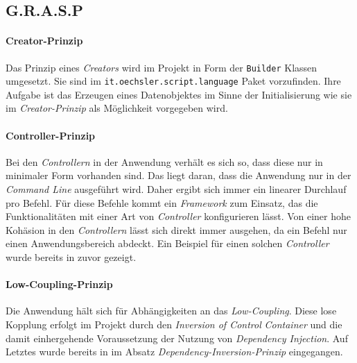 \bgroup

    \label{lst:apply_command}
\egroup

\subsection{G.R.A.S.P}
\label{subsec:grasp}

\paragraph{Creator-Prinzip}

Das Prinzip eines \emph{Creators} wird im Projekt in Form der \texttt{Builder} Klassen umgesetzt.
Sie sind im \texttt{it.oechsler.script.language} Paket vorzufinden.
Ihre Aufgabe ist das Erzeugen eines Datenobjektes im Sinne der Initialisierung wie sie im \emph{Creator-Prinzip} als Möglichkeit vorgegeben wird.

\paragraph{Controller-Prinzip}

Bei den \emph{Controllern} in der Anwendung verhält es sich so, dass diese nur in minimaler Form vorhanden sind.
Das liegt daran, dass die Anwendung nur in der \emph{Command Line} ausgeführt wird.
Daher ergibt sich immer ein linearer Durchlauf pro Befehl.
Für diese Befehle kommt ein \emph{Framework} zum Einsatz, das die Funktionalitäten mit einer Art von \emph{Controller} konfigurieren lässt.
Von einer hohe Kohäsion in den \emph{Controllern} lässt sich direkt immer ausgehen, da ein Befehl nur einen Anwendungsbereich abdeckt.
Ein Beispiel für einen solchen \emph{Controller} wurde bereits in  zuvor gezeigt.

\paragraph{Low-Coupling-Prinzip}

Die Anwendung hält sich für Abhängigkeiten an das \emph{Low-Coupling}.
Diese lose Kopplung erfolgt im Projekt durch den \emph{Inversion of Control} \emph{Container} und die damit einhergehende Voraussetzung der Nutzung von \emph{Dependency Injection}.
Auf Letztes wurde bereits in  im Absatz \emph{Dependency-Inversion-Prinzip} eingegangen.

